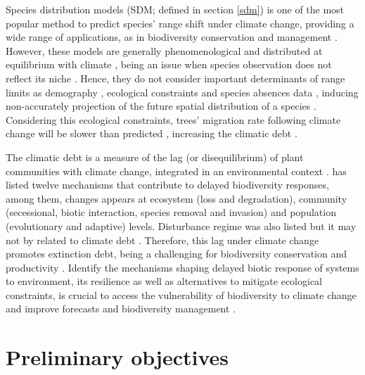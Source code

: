 Species distribution models (SDM; defined in section \ref{sdm}) is one of the most popular method to predict species' range shift under climate change, providing a wide range of applications, as in biodiversity conservation and management \citep{Guisan2005,Guisan2013}.
However, these models are generally phenomenological and  distributed at equilibrium with climate \citep[e.g.][]{Pigot2013}, being an issue when species observation does not reflect its niche \citep{Schurr2012}.
Hence, they do not consider important determinants of range limits as demography \citep{Louthan2015}, ecological constraints \citep{Wisz2013,Pigot2013} and species absences data \citep{Koshkina2017}, inducing non-accurately projection of the future spatial distribution of a species \citep{Tavecchia2016}.
Considering this ecological constraints, trees' migration rate following climate change will be slower than predicted \citep{Bertrand2011,Sittaro2017}, increasing the climatic debt \citep{Bertrand2016}.

The climatic debt is a measure of the lag (or disequilibrium) of plant communities with climate change, integrated in an environmental context \citep{Bertrand2016}.
\citet{Essl2015} has listed twelve mechanisms that contribute to delayed biodiversity responses, among them, changes appears at ecosystem (loss and degradation), community (secessional, biotic interaction, species removal and invasion) and population (evolutionary and adaptive) levels.
Disturbance regime was also listed but it may not by related to climate debt \citep{Bertrand2016}.
Therefore, this lag under climate change promotes extinction debt, being a challenging for biodiversity conservation \citep{Kuussaari2009} and productivity \citep{Lasch2002}.
Identify the mechanisms shaping delayed biotic response of systems to environment, its resilience as well as alternatives to mitigate ecological constraints, is crucial to access the vulnerability of biodiversity to climate change and improve forecasts and biodiversity management \citep{Essl2015,Oliver2015,Bertrand2016}.

\section{Preliminary objectives}

